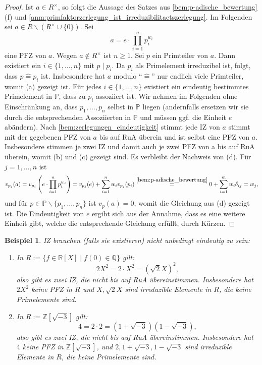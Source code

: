 \documentclass[a4paper, twoside, 11pt, ngerman]{report}
\newcommand{\PP}{\mathds P}
\newcommand{\QQ}{\mathds Q}
\newcommand{\RR}{\mathds R}
\newcommand{\ZZ}{\mathds Z}
\renewcommand{\setminus}{\smallsetminus}
\newcommand{\assoc}{\mathrel{\widehat{=}}}
\theoremstyle{definistyle}
\newtheorem{bsp}[satz]{Beispiel}
\theoremstyle{remark}
\begin{document}
\begin{proof}
Ist $a\in R^\times$, so folgt die Aussage des Satzes aus \ref{bem:p-adische_bewertung}(f) und \ref{anm:primfaktorzerlegung_ist_irreduzibilitaetszerlegung}. Im Folgenden sei $a\in R\setminus(R^\times\cup\{0\})$. Sei 
\[
a = e \cdot \prod_{i=1}^n p_i^{w_i} \tag{*} \label{eq:PFZ}
\]
eine PFZ von $a$. Wegen $a\not\in R^\times$ ist $n\geq 1$. Sei $p$ ein Primteiler von $a$. Dann existiert ein $i \in \{1, \dots, n\}$ mit $p \mid p_i$. Da $p_i$ als Primelement irreduzibel ist, folgt, dass $p \assoc p_i$ ist. Insbesondere hat $a$ modulo "`$\assoc$"' nur endlich viele Primteiler, womit (a) gezeigt ist. Für jedes $i\in\{1,\ldots,n\}$ existiert ein eindeutig bestimmtes Primelement in $\PP$, dass zu $p_i$ assoziiert ist. Wir nehmen im Folgenden ohne Einschränkung an, dass $p_1,\ldots,p_n$ selbst in $\PP$ liegen (andernfalls ersetzen wir sie durch die entsprechenden Assoziierten in $\PP$ und müssen ggf. die Einheit $e$ abändern). Nach
\ref{bem:zerlegungen_eindeutigkeit} stimmt jede IZ von $a$ stimmt mit der gegebenen
PFZ von $a$ bis auf RuA überein und ist selbst eine PFZ von $a$. Insbesondere stimmen je zwei IZ und damit auch je zwei PFZ von a bis auf RuA überein, womit (b) und (c) gezeigt sind. Es verbleibt der Nachweis von (d). Für $j=1,\ldots,n$ ist
\[
v_{p_j}(a) = v_{p_j}\left(e \cdot \prod_{i=1}^n p_i^{w_i}\right) = v_{p_j}(e) + \sum_{i=1}^n w_i v_{p_j}(p_i)\overset{\ref{bem:p-adische_bewertung}}{=}0+\sum_{i=1}^m w_i\delta_{ij}=w_j,
\]
und für $p\in\PP\setminus\{p_1,\ldots,p_n\}$ ist $v_p(a)=0$, womit die Gleichung aus (d) gezeigt ist.
Die Eindeutigkeit von $e$ ergibt sich aus der Annahme, dass es eine weitere Einheit gibt, welche die entsprechende Gleichung erfüllt, durch Kürzen.
\end{proof}



\begin{bsp}\label{bsp:irreduzibilitaetszerlegungen_eindeutigkeit}
IZ brauchen (falls sie existieren) nicht unbedingt eindeutig zu sein:
\begin{enumerate}[label=(\alph*)]
    \item In $R := \{f \in \RR[X] \mid f(0) \in \QQ\}$ gilt:
    \[
    2 X^2 = 2 \cdot X^2 = (\sqrt{2}X)^2,
    \]
    also gibt es zwei IZ, die nicht bis auf RuA übereinstimmen. Insbesondere hat $2X^2$ keine PFZ in $R$ und $X, \sqrt{2} X$ sind irreduzible Elemente in $R$, die keine Primelemente sind.

    \item In $R := \ZZ[\sqrt{-3}]$ gilt:
    \[
    4 = 2 \cdot 2 = (1 + \sqrt{-3})(1 - \sqrt{-3}),
    \]
    also gibt es zwei IZ, die nicht bis auf RuA übereinstimmen. Insbesondere hat $4$ keine PFZ in $\ZZ[\sqrt{-3}]$, und $2, 1 + \sqrt{-3}, 1 - \sqrt{-3}$ sind irreduzible Elemente in $R$, die keine Primelemente sind.
\end{enumerate}
\end{bsp}
\end{document}
